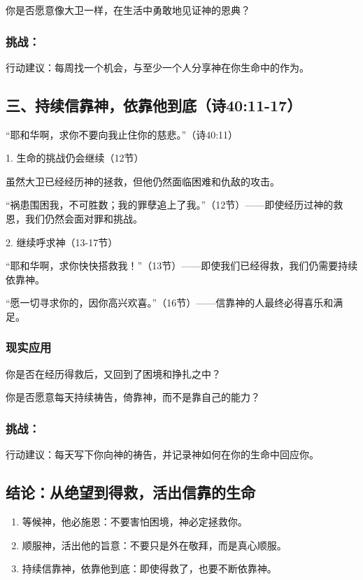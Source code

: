 \documentclass[a4paper, 12pt]{article}
\begin{document}
你是否愿意像大卫一样，在生活中勇敢地见证神的恩典？
\subsubsection*{挑战：}

\hspace{0.6cm}行动建议：每周找一个机会，与至少一个人分享神在你生命中的作为。
\subsection*{三、持续信靠神，依靠他到底（诗40:11-17）}
“耶和华啊，求你不要向我止住你的慈悲。”（诗40:11）

1. 生命的挑战仍会继续（12节）

虽然大卫已经经历神的拯救，但他仍然面临困难和仇敌的攻击。

“祸患围困我，不可胜数；我的罪孽追上了我。”（12节）——即使经历过神的救恩，我们仍然会面对罪和挑战。

2. 继续呼求神（13-17节）

“耶和华啊，求你快快搭救我！”（13节）——即使我们已经得救，我们仍需要持续依靠神。

“愿一切寻求你的，因你高兴欢喜。”（16节）——信靠神的人最终必得喜乐和满足。

\subsubsection*{现实应用}
\hspace{0.6cm}你是否在经历得救后，又回到了困境和挣扎之中？

你是否愿意每天持续祷告，倚靠神，而不是靠自己的能力？
\subsubsection*{挑战：}

\hspace{0.6cm}行动建议：每天写下你向神的祷告，并记录神如何在你的生命中回应你。
\subsection*{结论：从绝望到得救，活出信靠的生命}
\begin{enumerate}
    \item 等候神，他必施恩：不要害怕困境，神必定拯救你。

    \item 顺服神，活出他的旨意：不要只是外在敬拜，而是真心顺服。

    \item 持续信靠神，依靠他到底：即使得救了，也要不断依靠神。

\end{enumerate}
\end{document}
